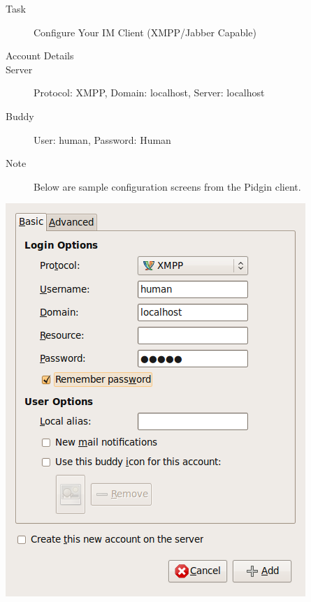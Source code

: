 \begin{description}
\item [Task] Configure Your IM Client (XMPP/Jabber Capable)
\item[Account Details]
\item[Server] Protocol: XMPP, Domain: localhost, Server: localhost
\item[Buddy] User: human, Password: Human
\item[Note] Below are sample configuration screens from the Pidgin client.
\end{description}
\begin{center}
\includegraphics[scale=0.5]{figs/deploy/pidgin-1.png} 

\end{center}
